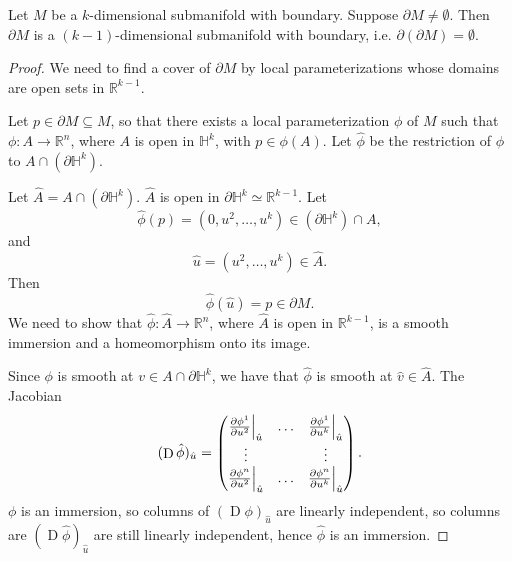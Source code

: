 \documentclass[notoc,notitlepage]{tufte-book}
\DeclareMathOperator{\D}{D}
\begin{document}
\begin{propo}\label{propo:dimension_of_the_boundary_of_a_submanifold}
  Let $M$ be a $k$-dimensional submanifold with boundary. Suppose $\partial M
  \neq \emptyset$. Then $\partial M$ is a $(k - 1)$-dimensional submanifold with
  boundary, i.e. $\partial(\partial M) = \emptyset$.
\end{propo}

\begin{proof}
  We need to find a cover of $\partial M$ by local parameterizations whose
  domains are open sets in $\mathbb{R}^{k-1}$.

  Let  $p \in \partial M \subseteq M$, so that there exists a local
  parameterization $\phi$ of $M$ such that $\phi : A \to \mathbb{R}^n$, where $A$ 
  is open in $\mathbb{H}^k$, with $p \in \phi(A)$. Let $\hat{\phi}$ be the
  restriction of $\phi$ to $A \cap (\partial \mathbb{H}^k)$.

  Let $\hat{A} = A \cap (\partial \mathbb{H}^k)$.  $\hat{A}$ is
  open in $\partial \mathbb{H}^k \simeq \mathbb{R}^{k-1}$. Let
  \begin{equation*}
    \hat{\phi}(p) = (0, u^2, \ldots, u^k) \in (\partial \mathbb{H}^k) \cap A,
  \end{equation*}
  and
  \begin{equation*}
    \hat{u} = (u^2, \ldots, u^k) \in \hat{A}.
  \end{equation*}
  Then
  \begin{equation*}
    \hat{\phi}(\hat{u}) = p \in \partial M.
  \end{equation*}
  We need to show that $\hat{\phi} : \hat{A} \to \mathbb{R}^n$, where $\hat{A}$ 
  is open in $\mathbb{R}^{k-1}$, is a smooth immersion and a homeomorphism onto
  its image.

  Since $\phi$ is smooth at $v \in A \cap \partial \mathbb{H}^k$, we have that
  $\hat{\phi}$ is smooth at $\hat{v} \in \hat{A}$. The Jacobian
  \begin{equation*}
    (\D \hat{\phi})_{\hat{u}} = \begin{pmatrix}
      \frac{\partial \phi^1}{\partial u^2} \at{\hat{u}}{} & \hdots &
      \frac{\partial \phi^1}{\partial u^k}
      \at{\hat{u}}{} \\
      \vdots & & \vdots \\
      \frac{\partial \phi^n}{\partial u^2} \at{\hat{u}}{} & \hdots & \frac{\partial \phi^n}{\partial u^k} \at{\hat{u}}{}
    \end{pmatrix}.
  \end{equation*}
  $\phi$ is an immersion, so columns of $(\D \phi)_{\hat{u}}$ are linearly
  independent, so columns are $(\D \hat{\phi})_{\hat{u}}$ are still linearly
  independent, hence $\hat{\phi}$ is an immersion.


\end{proof}
\end{document}
